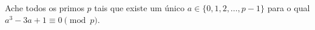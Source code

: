 Ache todos os primos $p$ tais que existe um único $a \in \{ 0, 1, 2, \dots, p-1 \}$ para o qual $a^3 - 3a + 1 \equiv 0 \pmod{p}$.
